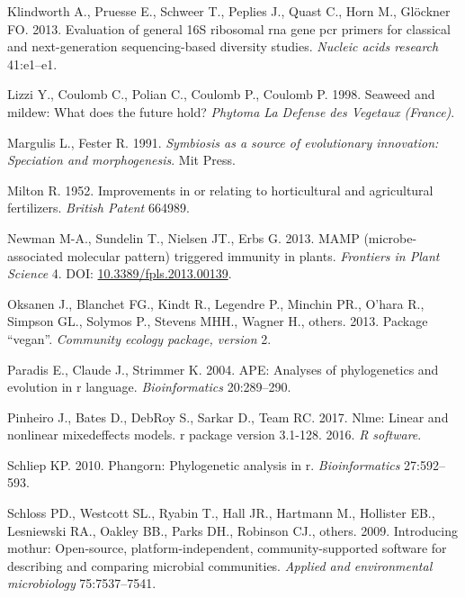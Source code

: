 \documentclass[11pt,]{article}
\begin{document}
\hypertarget{ref-klindworth2013evaluation}{}
Klindworth A., Pruesse E., Schweer T., Peplies J., Quast C., Horn M.,
Glöckner FO. 2013. Evaluation of general 16S ribosomal rna gene pcr
primers for classical and next-generation sequencing-based diversity
studies. \emph{Nucleic acids research} 41:e1--e1.

\hypertarget{ref-lizzi1998seaweed}{}
Lizzi Y., Coulomb C., Polian C., Coulomb P., Coulomb P. 1998. Seaweed
and mildew: What does the future hold? \emph{Phytoma La Defense des
Vegetaux (France)}.

\hypertarget{ref-margulis1991symbiosis}{}
Margulis L., Fester R. 1991. \emph{Symbiosis as a source of evolutionary
innovation: Speciation and morphogenesis}. Mit Press.

\hypertarget{ref-milton1952improvements}{}
Milton R. 1952. Improvements in or relating to horticultural and
agricultural fertilizers. \emph{British Patent} 664989.

\hypertarget{ref-Newman2013}{}
Newman M-A., Sundelin T., Nielsen JT., Erbs G. 2013. MAMP
(microbe-associated molecular pattern) triggered immunity in plants.
\emph{Frontiers in Plant Science} 4. DOI:
\href{https://doi.org/10.3389/fpls.2013.00139}{10.3389/fpls.2013.00139}.

\hypertarget{ref-oksanen2013package}{}
Oksanen J., Blanchet FG., Kindt R., Legendre P., Minchin PR., O'hara R.,
Simpson GL., Solymos P., Stevens MHH., Wagner H., others. 2013. Package
``vegan''. \emph{Community ecology package, version} 2.

\hypertarget{ref-paradis2004ape}{}
Paradis E., Claude J., Strimmer K. 2004. APE: Analyses of phylogenetics
and evolution in r language. \emph{Bioinformatics} 20:289--290.

\hypertarget{ref-pinheiro2017nlme}{}
Pinheiro J., Bates D., DebRoy S., Sarkar D., Team RC. 2017. Nlme: Linear
and nonlinear mixedeffects models. r package version 3.1-128. 2016.
\emph{R software}.

\hypertarget{ref-schliep2010phangorn}{}
Schliep KP. 2010. Phangorn: Phylogenetic analysis in r.
\emph{Bioinformatics} 27:592--593.

\hypertarget{ref-schloss2009introducing}{}
Schloss PD., Westcott SL., Ryabin T., Hall JR., Hartmann M., Hollister
EB., Lesniewski RA., Oakley BB., Parks DH., Robinson CJ., others. 2009.
Introducing mothur: Open-source, platform-independent,
community-supported software for describing and comparing microbial
communities. \emph{Applied and environmental microbiology}
75:7537--7541.
\end{document}
